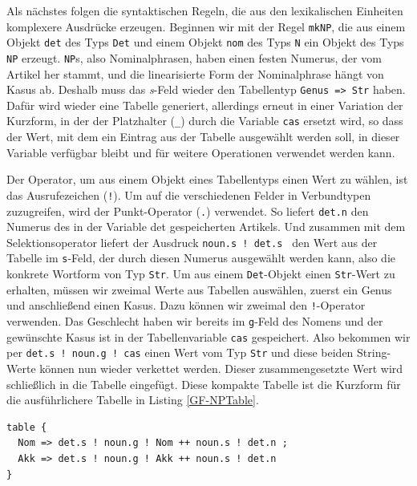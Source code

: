 Als nächstes folgen die syntaktischen Regeln, die aus den lexikalischen Einheiten komplexere Ausdrücke erzeugen. Beginnen wir mit der Regel \texttt{mkNP}, die aus einem Objekt \texttt{det} des Typs \texttt{Det} und einem Objekt \texttt{nom} des Typs \texttt{N} ein Objekt des Typs \texttt{NP} erzeugt. \texttt{NP}s, also Nominalphrasen, haben einen festen Numerus, der vom Artikel her stammt, und die linearisierte Form der Nominalphrase hängt von Kasus ab. Deshalb muss das \textit{s}-Feld wieder den Tabellentyp \texttt{Genus => Str} haben. Dafür wird wieder eine Tabelle generiert, allerdings erneut in einer Variation der Kurzform, in der der Platzhalter (\texttt{\_}) durch die Variable \texttt{cas} ersetzt wird, so dass der Wert, mit dem ein Eintrag aus der Tabelle ausgewählt werden soll, in dieser Variable verfügbar bleibt und für weitere Operationen verwendet werden kann. \par
Der Operator, um aus einem Objekt eines Tabellentyps einen Wert zu wählen, ist das Ausrufezeichen (\texttt{!}). Um auf die verschiedenen Felder in Verbundtypen zuzugreifen, wird der Punkt-Operator (\texttt{.}) verwendet. So liefert \texttt{det.n} den Numerus des in der Variable det gespeicherten Artikels. Und zusammen mit dem Selektionsoperator liefert der Ausdruck \texttt{noun.s ! det.s } den Wert aus der Tabelle im \texttt{s}-Feld, der durch diesen Numerus ausgewählt werden kann, also die konkrete Wortform von Typ \texttt{Str}. Um aus einem \texttt{Det}-Objekt einen \texttt{Str}-Wert zu erhalten, müssen wir zweimal Werte aus Tabellen auswählen, zuerst ein Genus und anschließend einen Kasus. Dazu können wir zweimal den \texttt{!}-Operator verwenden. Das Geschlecht haben wir bereits im \texttt{g}-Feld des Nomens und der gewünschte Kasus ist in der Tabellenvariable \texttt{cas} gespeichert. Also bekommen wir per \texttt{det.s ! noun.g ! cas} einen Wert vom Typ \texttt{Str} und diese beiden String-Werte können nun wieder verkettet werden. Dieser zusammengesetzte Wert wird schließlich in die Tabelle eingefügt. Diese kompakte Tabelle ist die Kurzform für die ausführlichere Tabelle in Listing \ref{GF-NPTable}. \par
\begin{lstlisting}[float=h!tp,caption={Ausführliche Form der Tabelle in Zeile 13 des Listings \ref{GF-SatzGer}},label={GF-NPTable}]
table { 
  Nom => det.s ! noun.g ! Nom ++ noun.s ! det.n ; 
  Akk => det.s ! noun.g ! Akk ++ noun.s ! det.n 
}
\end{lstlisting}
